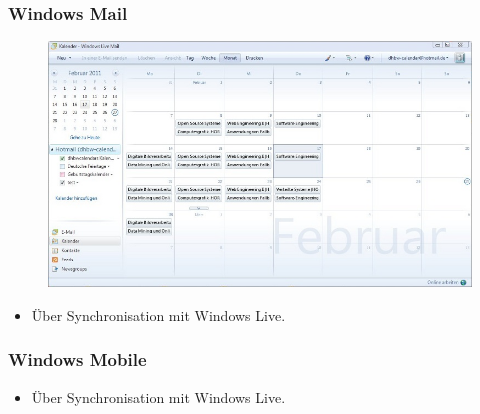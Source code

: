 \documentclass{beamer}
\begin{document}
\begin{frame}\frametitle{Windows Mail}
  \begin{figure}
    \centering
    \includegraphics[height=0.6\paperheight]{images/dhbwcalendar-live-desktop.jpg}
  \end{figure}
  \begin{itemize}
    \item Über Synchronisation mit Windows Live.
  \end{itemize}
\end{frame}

\begin{frame}\frametitle{Windows Mobile}
  \begin{figure}
    \centering
  \end{figure}
  \begin{itemize}
    \item Über Synchronisation mit Windows Live.
  \end{itemize}
\end{frame}
\end{document}
